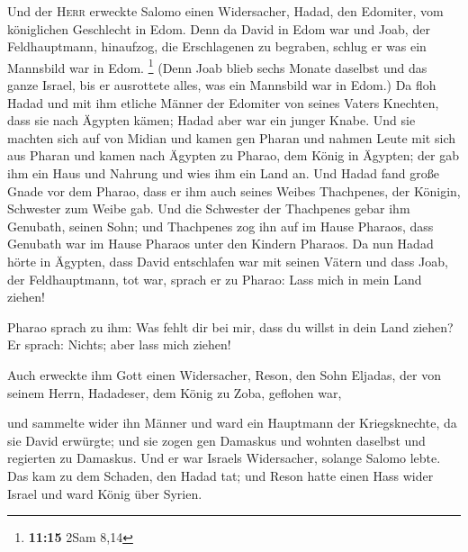  Und der \textsc{Herr} erweckte Salomo einen Widersacher,
Hadad, den Edomiter, vom königlichen Geschlecht in Edom. 
Denn da David in Edom war und Joab, der Feldhauptmann, hinaufzog, die
Erschlagenen zu begraben, schlug er was ein Mannsbild war in Edom.
\footnote{\textbf{11:15} 2Sam 8,14}  (Denn Joab blieb
sechs Monate daselbst und das ganze Israel, bis er ausrottete alles, was
ein Mannsbild war in Edom.)  Da floh Hadad und mit ihm
etliche Männer der Edomiter von seines Vaters Knechten, dass sie nach
Ägypten kämen; Hadad aber war ein junger Knabe.  Und sie
machten sich auf von Midian und kamen gen Pharan und nahmen Leute mit
sich aus Pharan und kamen nach Ägypten zu Pharao, dem König in Ägypten;
der gab ihm ein Haus und Nahrung und wies ihm ein Land an.
 Und Hadad fand große Gnade vor dem Pharao, dass er ihm
auch seines Weibes Thachpenes, der Königin, Schwester zum Weibe gab.
 Und die Schwester der Thachpenes gebar ihm Genubath,
seinen Sohn; und Thachpenes zog ihn auf im Hause Pharaos, dass Genubath
war im Hause Pharaos unter den Kindern Pharaos.  Da nun
Hadad hörte in Ägypten, dass David entschlafen war mit seinen Vätern und
dass Joab, der Feldhauptmann, tot war, sprach er zu Pharao: Lass mich in
mein Land ziehen!

 Pharao sprach zu ihm: Was fehlt dir bei mir, dass du
willst in dein Land ziehen? Er sprach: Nichts; aber lass mich ziehen!

 Auch erweckte ihm Gott einen Widersacher, Reson, den
Sohn Eljadas, der von seinem Herrn, Hadadeser, dem König zu Zoba,
geflohen war,

 und sammelte wider ihn Männer und ward ein Hauptmann der
Kriegsknechte, da sie David erwürgte; und sie zogen gen Damaskus und
wohnten daselbst und regierten zu Damaskus.  Und er war
Israels Widersacher, solange Salomo lebte. Das kam zu dem Schaden, den
Hadad tat; und Reson hatte einen Hass wider Israel und ward König über
Syrien.

